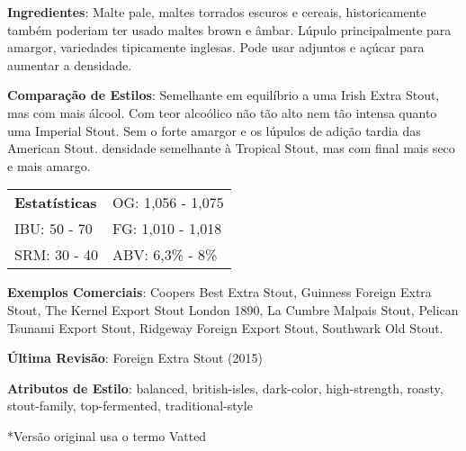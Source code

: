 \textbf{Ingredientes}: Malte pale, maltes torrados escuros e cereais, historicamente também poderiam ter usado maltes brown e âmbar. Lúpulo principalmente para amargor, variedades tipicamente inglesas. Pode usar adjuntos e açúcar para aumentar a densidade.

\textbf{Comparação de Estilos}: Semelhante em equilíbrio a uma Irish Extra Stout, mas com mais álcool. Com teor alcoólico não tão alto nem tão intensa quanto uma Imperial Stout. Sem o forte amargor e os lúpulos de adição tardia das American Stout. densidade semelhante à Tropical Stout, mas com final mais seco e mais amargo.

\begin{tabular}{@{}p{35mm}p{35mm}@{}}
  \textbf{Estatísticas} & OG: 1,056 - 1,075 \\
  IBU: 50 - 70  & FG: 1,010 - 1,018  \\
  SRM: 30 - 40   & ABV: 6,3\% - 8\%
\end{tabular}

\textbf{Exemplos Comerciais}: Coopers Best Extra Stout, Guinness Foreign Extra Stout, The Kernel Export Stout London 1890, La Cumbre Malpais Stout, Pelican Tsunami Export Stout, Ridgeway Foreign Export Stout, Southwark Old Stout.

\textbf{Última Revisão}: Foreign Extra Stout (2015)

\textbf{Atributos de Estilo}: balanced, british-isles, dark-color, high-strength, roasty, stout-family, top-fermented, traditional-style

*Versão original usa o termo Vatted

